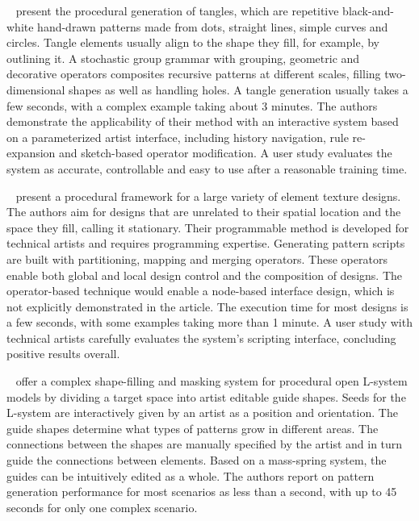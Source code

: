 \citeauthor*{santoni_2016_ggp}~\cite{santoni_2016_ggp} present the procedural generation of tangles, which are repetitive black-and-white hand-drawn patterns made from dots, straight lines, simple curves and circles. Tangle elements usually align to the shape they fill, for example, by outlining it. A stochastic group grammar with grouping, geometric and decorative operators composites recursive patterns at different scales, filling two-dimensional shapes as well as handling holes. A tangle generation usually takes a few seconds, with a complex example taking about 3 minutes. The authors demonstrate the applicability of their method with an interactive system based on a parameterized artist interface, including history navigation, rule re-expansion and sketch-based operator modification. A user study evaluates the system as accurate, controllable and easy to use after a reasonable training time.

\citeauthor*{loi_2017_pae}~\cite{loi_2017_pae} present a procedural framework for a large variety of element texture designs. The authors aim for designs that are unrelated to their spatial location and the space they fill, calling it stationary. Their programmable method is developed for technical artists and requires programming expertise. Generating pattern scripts are built with partitioning, mapping and merging operators. These operators enable both global and local design control and the composition of designs. The operator-based technique would enable a node-based interface design, which is not explicitly demonstrated in the article. The execution time for most designs is a few seconds, with some examples taking more than 1 minute. A user study with technical artists carefully evaluates the system’s scripting interface, concluding positive results overall.

\citeauthor*{loi_2017_pae}~\cite{loi_2017_pae} offer a complex shape-filling and masking system for procedural open L-system models by dividing a target space into artist editable guide shapes. Seeds for the L-system are interactively given by an artist as a position and orientation. The guide shapes determine what types of patterns grow in different areas. The connections between the shapes are manually specified by the artist and in turn guide the connections between elements. Based on a mass-spring system, the guides can be intuitively edited as a whole. The authors report on pattern generation performance for most scenarios as less than a second, with up to 45 seconds for only one complex scenario.

